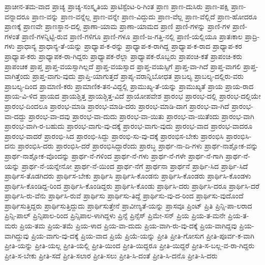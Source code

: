 {ಪ್ರಾಚೀನ-ತಮ-ವಾದ
ಪ್ರಾಚ್ಯ
ಪ್ರಾಚ್ಯ-ಸಂಸ್ಕೃತಿಯ
ಪ್ರಾಟಿಸ್ಟೆಂಟ-ರಿ-ಗಿಂತ
ಪ್ರಾಣ
ಪ್ರಾಣ-ದುಸಿರು
ಪ್ರಾಣ-ಪಕ್ಷಿ
ಪ್ರಾಣ-ವನ್ನಾದರೂ
ಪ್ರಾಣ-ವನ್ನು
ಪ್ರಾಣ-ವನ್ನೆಲ್ಲ
ಪ್ರಾಣ-ವನ್ನೇ
ಪ್ರಾಣ-ವಿದ್ದುದು
ಪ್ರಾಣ-ವೆಲ್ಲ
ಪ್ರಾಣ-ವೆಲ್ಲಿದೆ
ಪ್ರಾಣ-ಹೋದರೂ
ಪ್ರಾಣಕ್ಕೆ
ಪ್ರಾಣವೇ
ಪ್ರಾಣಸ್ಥಾನ-ದಲ್ಲಿ
ಪ್ರಾಣಾ-ಯಾಮ
ಪ್ರಾಣಾ-ಯಾಮದ
ಪ್ರಾಣಿ
ಪ್ರಾಣಿ-ಗಳನ್ನು
ಪ್ರಾಣಿ-ಗಳ
ಪ್ರಾಣಿ-ಗಳಂತೆ
ಪ್ರಾಣಿ-ಗಳನ್ನಿಟ್ಟಿ-ರುವ
ಪ್ರಾಣಿ-ಗಳಿಗೂ
ಪ್ರಾಣಿ-ಗಳೂ
ಪ್ರಾಣಿ-ಜ-ಗತ್ತಿ-ನಲ್ಲಿ
ಪ್ರಾಣಿ-ಯಲ್ಲಿಯೂ
ಪ್ರಾತಃಕಾಲ
ಪ್ರಾದ್ರಿ-ಗಳು
ಪ್ರಾಧಾನ್ಯ
ಪ್ರಾಧಾನ್ಯ-ತೆ-ಯನ್ನು
ಪ್ರಾಧ್ಯಾಪ-ಕ-ರನ್ನು
ಪ್ರಾಧ್ಯಾಪ-ಕ-ರಾಗಿದ್ದ
ಪ್ರಾಧ್ಯಾಪ-ಕ-ರಾದ
ಪ್ರಾಧ್ಯಾಪ-ಕರ
ಪ್ರಾಧ್ಯಾಪ-ಕರು
ಪ್ರಾಧ್ಯಾಪಕ-ರಾ-ಗಿದ್ದರು
ಪ್ರಾಧ್ಯಾಪಕ-ರೆಲ್ಲಾ
ಪ್ರಾಧ್ಯಾಪಕ-ರೊಬ್ಬರು
ಪ್ರಾಪಂಚಿ-ಕತೆ
ಪ್ರಾಪಂಚಿ-ಕರು
ಪ್ರಾಪಂಚಿಕ
ಪ್ರಾಪ್ತ
ಪ್ರಾಪ್ತ-ವಯಸ್ಸಾಗಿಲ್ಲದೆ
ಪ್ರಾಪ್ತ-ವಯಸ್ಸಾದ
ಪ್ರಾಪ್ತ-ವಯಸ್ಸಿಗೆ
ಪ್ರಾಪ್ತ-ವಾ-ಗಿದೆ
ಪ್ರಾಪ್ತ-ವಾಗಲಿ
ಪ್ರಾಪ್ತ-ವಾಗಿತ್ತೆಂದು
ಪ್ರಾಪ್ತ-ವಾಗು-ವುದು
ಪ್ರಾಪ್ತಿ-ಯಾಗುತ್ತದೆ
ಪ್ರಾಪ್ಯ-ವರಾನ್ನಿಬೋಧತ
ಪ್ರಾಬಲ್ಯ
ಪ್ರಾಬಲ್ಯ-ದಲ್ಲಿರು-ವರು
ಪ್ರಾಬಲ್ಯ-ದಿಂದ
ಪ್ರಾಮಾಣಿ-ಕರು
ಪ್ರಾಮಾಣಿಕ-ತನ-ವಿದ್ದಲ್ಲಿ
ಪ್ರಾಮುಖ್ಯ-ತೆ-ಯನ್ನು
ಪ್ರಾಮುಖ್ಯತೆ
ಪ್ರಾಯ
ಪ್ರಾಯ-ರಾದ
ಪ್ರಾಯ-ವಿ-ಳಿದ
ಪ್ರಾಯದ
ಪ್ರಾಯಶ್ಚಿತ್ತ
ಪ್ರಾಯಶ್ಚಿತ್ತ-ವಿದೆ
ಪ್ರಾಯೋಪವೇಶ
ಪ್ರಾರಂಭ
ಪ್ರಾರಂಭ-ದಲ್ಲಿ
ಪ್ರಾರಂಭ-ದಲ್ಲಿಯೇ
ಪ್ರಾರಂಭ-ದಿಂದಲೂ
ಪ್ರಾರಂಭ-ಮಾಡಿ
ಪ್ರಾರಂಭ-ಮಾಡಿ-ದರು
ಪ್ರಾರಂಭ-ಮಾಡಿ-ದಾಗ
ಪ್ರಾರಂಭ-ವಾ-ಗಿದೆ
ಪ್ರಾರಂಭ-ವಾ-ದದ್ದು
ಪ್ರಾರಂಭ-ವಾ-ದವು
ಪ್ರಾರಂಭ-ವಾ-ದುದು
ಪ್ರಾರಂಭ-ವಾ-ಯಿತು
ಪ್ರಾರಂಭ-ವಾ-ಯಿತೆಂದು
ಪ್ರಾರಂಭ-ವಾಗಿ
ಪ್ರಾರಂಭ-ವಾಗಿ-ರ-ಬಹುದು
ಪ್ರಾರಂಭ-ವಾಗು-ವು-ದಕ್ಕೆ
ಪ್ರಾರಂಭ-ವಾಗು-ವುದು
ಪ್ರಾರಂಭ-ವಾದ
ಪ್ರಾರಂಭ-ವಾದರೂ
ಪ್ರಾರಂಭ-ವಾದರೆ
ಪ್ರಾರಂಭಿ-ಸಿದ
ಪ್ರಾರಂಭಿ-ಸಿದ್ದು
ಪ್ರಾರಂಭಿ-ಸು-ವು-ದಕ್ಕೆ
ಪ್ರಾರಂಭಿಸ-ಬೇಕು
ಪ್ರಾರಂಭಿಸಿ
ಪ್ರಾರಂಭಿಸಿ-ದನು
ಪ್ರಾರಂಭಿಸಿ-ದರು
ಪ್ರಾರಂಭಿಸಿ-ದರೆ
ಪ್ರಾರಂಭಿಸಿದ್ದಾರೆಂದು
ಪ್ರಾರಬ್ಧ
ಪ್ರಾರ್ಥ-ನಾ-ದಿ-ಗಳು
ಪ್ರಾರ್ಥ-ನಾಶ್ಲೋಕ-ವನ್ನು
ಪ್ರಾರ್ಥ-ನಾಶ್ಲೋಕ-ವೊಂದನ್ನು
ಪ್ರಾರ್ಥ-ನೆ-ಗಳಿಂದ
ಪ್ರಾರ್ಥ-ನೆ-ಗಳು
ಪ್ರಾರ್ಥ-ನೆ-ಗಳೇ
ಪ್ರಾರ್ಥ-ನೆ-ಗಾಗಿ
ಪ್ರಾರ್ಥ-ನೆ-ಯನ್ನು
ಪ್ರಾರ್ಥ-ನೆ-ಯನ್ನೇನೋ
ಪ್ರಾರ್ಥ-ನೆ-ಯಿಂದ
ಪ್ರಾರ್ಥ-ನೆಗೆ
ಪ್ರಾರ್ಥನಾ
ಪ್ರಾರ್ಥನೆ
ಪ್ರಾರ್ಥಿ-ಸಿದ
ಪ್ರಾರ್ಥಿ-ಸಿದೆ
ಪ್ರಾರ್ಥಿಸ-ತೊಡಗಿದರು
ಪ್ರಾರ್ಥಿಸ-ಬೇಕು
ಪ್ರಾರ್ಥಿಸಿ
ಪ್ರಾರ್ಥಿಸಿ-ಕೊಂಡನು
ಪ್ರಾರ್ಥಿಸಿ-ಕೊಂಡರು
ಪ್ರಾರ್ಥಿಸಿ-ಕೊಂಡಳು
ಪ್ರಾರ್ಥಿಸಿ-ಕೊಂಡಿದ್ದ-ರಿಂದ
ಪ್ರಾರ್ಥಿಸಿ-ಕೊಂಡಿದ್ದರು
ಪ್ರಾರ್ಥಿಸಿ-ಕೊಂಡು
ಪ್ರಾರ್ಥಿಸಿ-ದರು
ಪ್ರಾರ್ಥಿಸಿ-ದರೂ
ಪ್ರಾರ್ಥಿಸಿ-ದರೆ
ಪ್ರಾರ್ಥಿಸಿ-ರು-ವೆನು
ಪ್ರಾರ್ಥಿಸಿ-ರುವೆ
ಪ್ರಾರ್ಥಿಸು
ಪ್ರಾರ್ಥಿಸು-ತಿದ್ದೆ
ಪ್ರಾರ್ಥಿಸು-ವು-ದ-ರಿಂದ
ಪ್ರಾರ್ಥಿಸು-ವುದೊಂದೆ
ಪ್ರಾರ್ಥಿಸುತ್ತಿದ್ದರು
ಪ್ರಾರ್ಥಿಸುತ್ತಿದ್ದುದು
ಪ್ರಾರ್ಥಿಸುತ್ತೇನೆ
ಪ್ರಾವೀಣ್ಯತೆ-ಯನ್ನು
ಪ್ರಾಸವೂ
ಪ್ರಿಂಟ್
ಪ್ರಿತಿ
ಪ್ರಿನ್ಸಿ-ಪಾ-ಲರಾದ
ಪ್ರಿನ್ಸಿ-ಪಾಲ್
ಪ್ರಿನ್ಸಿಪಾಲ-ರಿಂದ
ಪ್ರಿನ್ಸಿಪಾಲ-ಳಾಗಿದ್ದಳು
ಪ್ರಿನ್ಸೆ
ಪ್ರಿನ್ಸೆಸ್
ಪ್ರಿಮೇ-ಸನ್
ಪ್ರಿಯ
ಪ್ರಿಯ-ತ-ಮನೇ
ಪ್ರಿಯ-ತ-ಮರು
ಪ್ರಿಯ-ತಮ
ಪ್ರಿಯ-ತಮೆ
ಪ್ರಿಯ-ಳಾದ
ಪ್ರಿಯ-ವಾ-ದುದು
ಪ್ರಿಯ-ವಾಗಿ-ರು-ವು-ದಕ್ಕೆ
ಪ್ರಿಯ-ವಾಗಿದ್ದವು
ಪ್ರಿಯ-ವಾಗಿದ್ದುವು
ಪ್ರಿಯ-ವಾಗು-ವು-ದಕ್ಕೆ
ಪ್ರಿಯ-ವಾದ
ಪ್ರಿಯೆ
ಪ್ರಿಯೆ-ಯನ್ನು
ಪ್ರೀತಿ
ಪ್ರೀತಿ-ಗೋಸುಗ
ಪ್ರೀತಿ-ಪೂರ್ವ-ಕ-ವಾಗಿ
ಪ್ರೀತಿ-ಯನ್ನು
ಪ್ರೀತಿ-ಯಲ್ಲ
ಪ್ರೀತಿ-ಯಲ್ಲಿ
ಪ್ರೀತಿ-ಯಿಂದ
ಪ್ರೀತಿ-ಯಿದ್ದರೂ
ಪ್ರೀತಿ-ಯಿದ್ದರೆ
ಪ್ರೀತಿ-ಸ-ಬಲ್ಲ-ವ-ರಾ-ಗಿದ್ದರು
ಪ್ರೀತಿ-ಸ-ಬೇಕು
ಪ್ರೀತಿ-ಸದೆ
ಪ್ರೀತಿ-ಸಲಾರ
ಪ್ರೀತಿ-ಸಲು
ಪ್ರೀತಿ-ಸಿ-ದಂತೆ
ಪ್ರೀತಿ-ಸಿ-ದನೊ
ಪ್ರೀತಿ-ಸಿ-ದರು
}
